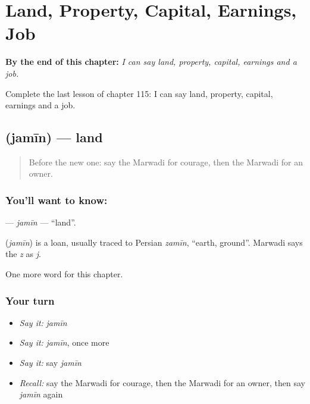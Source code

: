 
\chapter{Land, Property, Capital, Earnings, Job}
\label{ch:mw-land-property-capital-earnings-job}

\begin{chapteropening}
\textbf{By the end of this chapter:} \emph{I can say land, property, capital, earnings and a job.}

Complete the last lesson of chapter 115: I can say land, property, capital, earnings and a job.
\end{chapteropening}

\section[\texorpdfstring{\mw{जमीन} (jamīn)}{जमीन (jamīn)}]{ (jamīn) — land}

\label{lesson:MW-C115-jamin}



\begin{quote}
Before the new one: say the Marwadi for courage, then the Marwadi for an owner.
\end{quote}

\subsection*{You'll want to know: }
\textbf{} — \emph{jamīn} — \textquotedblleft{}land\textquotedblright{}.

\begin{cousinweb}
\textbf{} (\emph{jamīn}) is a loan, usually traced to Persian \emph{zamīn}, \textquotedblleft{}earth, ground\textquotedblright{}. Marwadi says the \emph{z} as \emph{j}.
\end{cousinweb}

\begin{grammarlens}[title={What you've built}]
One more word for this chapter.
\end{grammarlens}

\subsection*{Your turn}
\begin{itemize}
\raggedright
  \item \emph{Say it:} \emph{jamīn}
  \item \emph{Say it:} \emph{jamīn}, once more
  \item \emph{Say it:} say \emph{jamīn}
  \item \emph{Recall:} say the Marwadi for courage, then the Marwadi for an owner, then say \emph{jamīn} again
\end{itemize}

